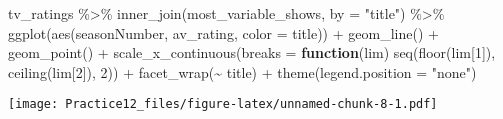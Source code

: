 \documentclass[
]{article}
\newenvironment{Shaded}{\begin{snugshade}}{\end{snugshade}}
\newcommand{\AttributeTok}[1]{\textcolor[rgb]{0.77,0.63,0.00}{#1}}
\newcommand{\ControlFlowTok}[1]{\textcolor[rgb]{0.13,0.29,0.53}{\textbf{#1}}}
\newcommand{\DecValTok}[1]{\textcolor[rgb]{0.00,0.00,0.81}{#1}}
\newcommand{\FunctionTok}[1]{\textcolor[rgb]{0.00,0.00,0.00}{#1}}
\newcommand{\NormalTok}[1]{#1}
\newcommand{\SpecialCharTok}[1]{\textcolor[rgb]{0.00,0.00,0.00}{#1}}
\newcommand{\StringTok}[1]{\textcolor[rgb]{0.31,0.60,0.02}{#1}}
\begin{document}
\begin{Shaded}
\begin{Highlighting}[]
\NormalTok{tv\_ratings }\SpecialCharTok{\%\textgreater{}\%}
  \FunctionTok{inner\_join}\NormalTok{(most\_variable\_shows, }\AttributeTok{by =} \StringTok{"title"}\NormalTok{) }\SpecialCharTok{\%\textgreater{}\%}
  \FunctionTok{ggplot}\NormalTok{(}\FunctionTok{aes}\NormalTok{(seasonNumber, av\_rating, }\AttributeTok{color =}\NormalTok{ title)) }\SpecialCharTok{+}
  \FunctionTok{geom\_line}\NormalTok{() }\SpecialCharTok{+}
  \FunctionTok{geom\_point}\NormalTok{() }\SpecialCharTok{+}
  \FunctionTok{scale\_x\_continuous}\NormalTok{(}\AttributeTok{breaks =} \ControlFlowTok{function}\NormalTok{(lim) }\FunctionTok{seq}\NormalTok{(}\FunctionTok{floor}\NormalTok{(lim[}\DecValTok{1}\NormalTok{]), }\FunctionTok{ceiling}\NormalTok{(lim[}\DecValTok{2}\NormalTok{]), }\DecValTok{2}\NormalTok{)) }\SpecialCharTok{+}
  \FunctionTok{facet\_wrap}\NormalTok{(}\SpecialCharTok{\textasciitilde{}}\NormalTok{ title) }\SpecialCharTok{+}
  \FunctionTok{theme}\NormalTok{(}\AttributeTok{legend.position =} \StringTok{"none"}\NormalTok{)}
\end{Highlighting}
\end{Shaded}

\texttt{[image: Practice12\_files/figure-latex/unnamed-chunk-8-1.pdf]}
\end{document}
